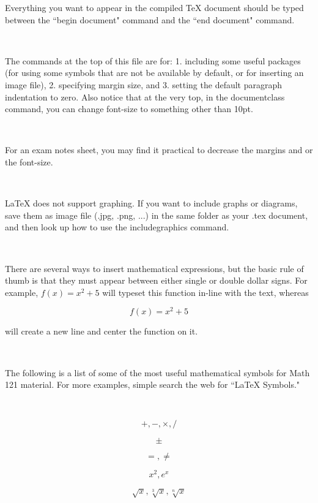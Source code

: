 \documentclass[10pt]{amsart}
\begin{document}
Everything you want to appear in the compiled TeX document should be typed between the ``begin document" command and the ``end document" command.

\  %


The commands at the top of this file are for: 1. including some useful packages (for using some symbols that are not be available by default, or for inserting an image file), 2. specifying margin size, and 3. setting the default paragraph indentation to zero.  Also notice that at the very top, in the documentclass command, you can change font-size to something other than 10pt.

\

For an exam notes sheet, you may find it practical to decrease the margins and or the font-size.

\

LaTeX does not support graphing.  If you want to include graphs or diagrams, save them as image file (.jpg, .png, ...) in the same folder as your .tex document, and then look up how to use the includegraphics command. 

\

There are several ways to insert mathematical expressions, but the basic rule of thumb is that they must appear between either single or double dollar signs.  For example, $f(x) = x^2 + 5$ will typeset this function in-line with the text, whereas

$$
f(x) = x^2 + 5
$$

will create a new line and center the function on it.

\

The following is a list of some of the most useful mathematical symbols for Math 121 material.  For more examples, simple search the web for ``LaTeX Symbols." 

\

$$
+, -, \times, /  %
$$

$$
\pm  %
$$

$$
=, \neq  %
$$

$$
x^2, e^x  %
$$

$$
\sqrt{x}, \sqrt[3]{x}, \sqrt[n]{x}  %
$$
\end{document}
